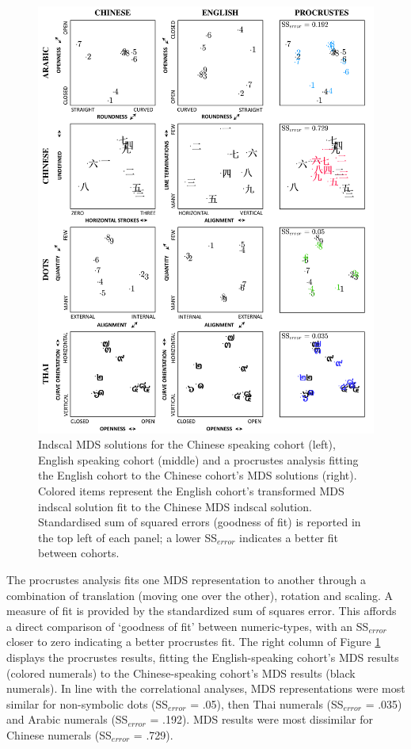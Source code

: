 \newpage
\begin{figure}[!htb]
\centering \includegraphics[width=\linewidth]{Figures/CrossWheel/IndscalCompared.pdf}
\caption{Indscal MDS solutions for the Chinese speaking cohort (left), English speaking cohort (middle) and a procrustes analysis fitting the English cohort to the Chinese cohort's MDS solutions (right). Colored items represent the English cohort's transformed MDS indscal solution fit to the Chinese MDS indscal solution. Standardised sum of squared errors (goodness of fit) is reported in the top left of each panel; a lower SS$_{error}$ indicates a better fit between cohorts.}
\label{fig:IndscalCompared_Procrustes}
\end{figure}

The procrustes analysis fits one MDS representation to another through a combination of translation (moving one over the other), rotation and scaling. A measure of fit is provided by the standardized sum of squares error. This affords a direct comparison of `goodness of fit' between numeric-types, with an SS$_{error}$ closer to zero indicating a better procrustes fit. The right column of Figure \ref{fig:IndscalCompared_Procrustes} displays the procrustes results, fitting the English-speaking cohort's MDS results (colored numerals) to the Chinese-speaking cohort's MDS results (black numerals). In line with the correlational analyses, MDS representations were most similar for non-symbolic dots (SS$_{error}$ = .05), then Thai numerals (SS$_{error}$ = .035) and Arabic numerals (SS$_{error}$ = .192). MDS results were most dissimilar for Chinese numerals (SS$_{error}$ = .729).

